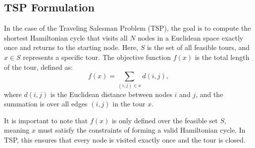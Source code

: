 \subsection{TSP Formulation}

In the case of the Traveling Salesman Problem (TSP), the goal is to compute the shortest Hamiltonian cycle that visits all $N$ nodes in a Euclidean space exactly once and returns to the starting node. Here, $S$ is the set of all feasible tours, and $x \in S$ represents a specific tour. The objective function $f(x)$ is the total length of the tour, defined as:
\[
f(x) = \sum_{(i, j) \in x} d(i, j),
\]
where $d(i, j)$ is the Euclidean distance between nodes $i$ and $j$, and the summation is over all edges $(i, j)$ in the tour $x$.

It is important to note that $f(x)$ is only defined over the feasible set $S$, meaning $x$ must satisfy the constraints of forming a valid Hamiltonian cycle. In TSP, this ensures that every node is visited exactly once and the tour is closed.

